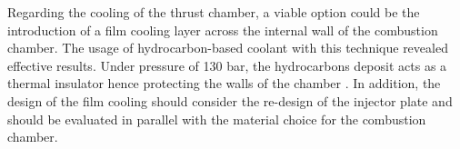 Regarding the cooling of the thrust chamber, a viable option could be the introduction of a film cooling layer across the internal wall of the combustion chamber. The usage of hydrocarbon-based coolant with this technique revealed effective results. Under pressure of 130 bar, the hydrocarbons deposit acts as a thermal insulator hence protecting the walls of the chamber \cite{huzel_huang}. In addition, the design of the film cooling should consider the re-design of the injector plate and should be evaluated in parallel with the material choice for the combustion chamber. 

